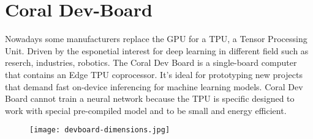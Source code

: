 \section{Coral Dev-Board}
\label{sec:hard-devboard}
Nowadays some manufacturers replace the GPU for a TPU, a Tensor Processing Unit.
Driven by the esponetial interest for deep learning in different field such as
reserch, industries, robotics. The Coral Dev Board is a single-board computer
that contains an Edge TPU coprocessor. It's ideal for prototyping new projects
that demand fast on-device inferencing for machine learning models. Coral Dev
Board cannot train a neural network because the TPU is specific designed to work
with special pre-compiled model and to be small and energy efficient.
%
\begin{figure}[htb]
	\centering
	\texttt{[image: devboard-dimensions.jpg]}
	\label{fig:dev-board}
\end{figure}
%

